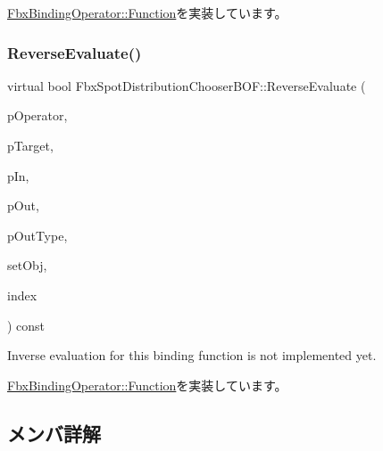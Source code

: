 \hyperlink{class_fbx_binding_operator_1_1_function_aa238a63d12508db3cb5c00a4b157524e}{Fbx\+Binding\+Operator\+::\+Function}を実装しています。

\mbox{\label{class_fbx_spot_distribution_chooser_b_o_f_a8442158a644f0c6c24cbcf30d86413c7}} 
\subsubsection{\texorpdfstring{Reverse\+Evaluate()}{ReverseEvaluate()}}
{\footnotesize\ttfamily virtual bool Fbx\+Spot\+Distribution\+Chooser\+B\+O\+F\+::\+Reverse\+Evaluate (\begin{DoxyParamCaption}\item[{const \hyperlink{class_fbx_binding_operator}{Fbx\+Binding\+Operator} $\ast$}]{p\+Operator,  }\item[{const \hyperlink{class_fbx_object}{Fbx\+Object} $\ast$}]{p\+Target,  }\item[{const void $\ast$}]{p\+In,  }\item[{void $\ast$$\ast$}]{p\+Out,  }\item[{\hyperlink{fbxpropertytypes_8h_a73913a5ddfb20e57c6f25e9e6784bd92}{E\+Fbx\+Type} $\ast$}]{p\+Out\+Type,  }\item[{bool}]{set\+Obj,  }\item[{int}]{index }\end{DoxyParamCaption}) const\hspace{0.3cm}{\ttfamily [virtual]}}



Inverse evaluation for this binding function is not implemented yet. 



\hyperlink{class_fbx_binding_operator_1_1_function_a9bbeec993a6e453a6569e7f40a85fd52}{Fbx\+Binding\+Operator\+::\+Function}を実装しています。



\subsection{メンバ詳解}
\mbox{\label{class_fbx_spot_distribution_chooser_b_o_f_a593bafa23828b4991ad09ac5f0540304}} 
